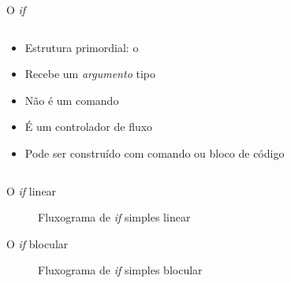 \documentclass[14pt]{beamer}
\begin{document}
		\begin{frame}{O \textit{if}}
			\begin{columns}
				\begin{column}{0.65\textwidth}
					\begin{itemize}
						\presentationPause\item Estrutura primordial: \presentationPause o 
						\presentationPause\item Recebe um \emph{argumento} tipo 
						\presentationPause\item Não é um comando
						\presentationPause\item É um controlador de fluxo
						\presentationPause\item Pode ser construído com comando ou bloco de código
					\end{itemize}
					\presentationPause
				\end{column}
				\begin{column}{0.35\textwidth}
					\presentationPause
				\end{column}
			\end{columns}
		\end{frame}

		\begin{frame}{O \textit{if} linear}
			\begin{figure}[H]
				\centering
				
				\caption{Fluxograma de \textit{if} simples linear}
				\label{fig.flow.if.line}
			\end{figure}
		\end{frame}

		\begin{frame}{O \textit{if} blocular}
			\begin{figure}[H]
				\centering
				
				\caption{Fluxograma de \textit{if} simples blocular}
				\label{fig.flow.if.block}
			\end{figure}
		\end{frame}
\end{document}
